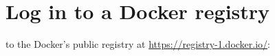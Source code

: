 \section{Log in to a Docker registry}
 to the Docker's public registry at \url{https://registry-1.docker.io/}:

%